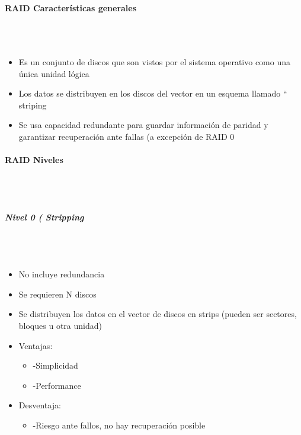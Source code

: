 	
\paragraph{RAID Características generales}\mbox{}\\\\%
\begin{itemize}
\item Es un conjunto de discos que son vistos por el sistema operativo como una única unidad lógica
\item Los datos se distribuyen en los discos del vector en un esquema llamado “ striping
\item Se usa capacidad redundante para guardar información de paridad y garantizar recuperación ante fallas (a excepción de RAID 0
\end{itemize}

\paragraph{RAID Niveles}\mbox{}\\\\%

\subparagraph{Nivel 0 ( Stripping}\mbox{}\\\\%
\begin{itemize}
\item No incluye redundancia
\item Se requieren N discos
\item Se distribuyen los datos en el vector de discos en strips (pueden ser sectores, bloques u otra unidad)
\item Ventajas:
	\begin{itemize}
	\item -Simplicidad
	\item -Performance
	\end{itemize}
\item Desventaja:
	\begin{itemize}
	\item -Riesgo ante fallos, no hay recuperación posible
	\end{itemize}
\end{itemize}

